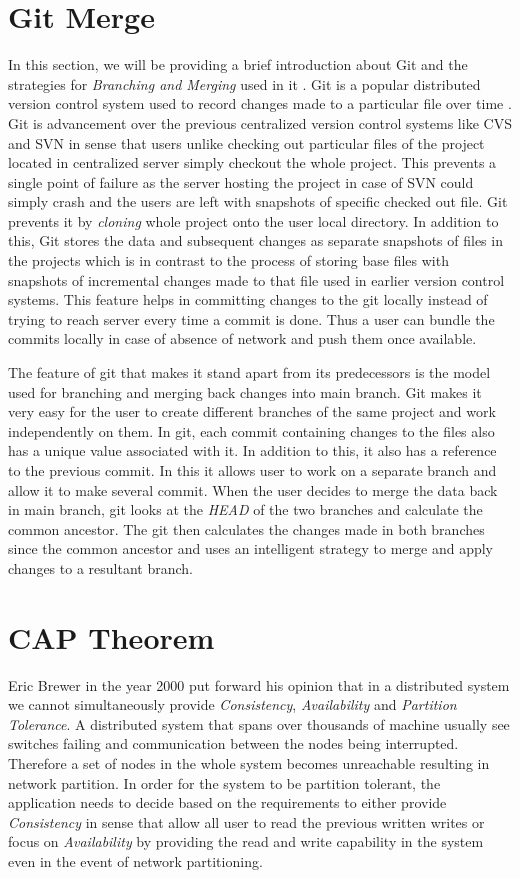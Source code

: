 \documentclass[12pt,a4paper,twoside,openright]{book}
\begin{document}
\section{Git Merge}
In this section, we will be providing a brief introduction about Git and the strategies for \textit{Branching and Merging} used in it \cite{gitmerge}. Git is a popular distributed version control system used to record changes made to a particular file over time \cite{gitVersionControl}. Git is advancement over the previous centralized version control systems like CVS \cite{cvs} and SVN \cite{svn} in sense that users unlike checking out particular files of the project located in centralized server simply checkout the whole project. This prevents a single point of failure as the server hosting the project in case of SVN could simply crash and the users are left with snapshots of specific checked out file. Git prevents it by \textit{cloning} whole project onto the user local directory. In addition to this, Git stores the data and subsequent changes as separate snapshots of files in the projects which is in contrast to the process of storing base files with snapshots of incremental changes made to that file used in earlier version control systems. This feature helps in committing changes to the git locally instead of trying to reach server every time a commit is done. Thus a user can bundle the commits locally in case of absence of network and push them once available.
\par The feature of git that makes it stand apart from its predecessors is the model used for branching and merging back changes into main branch. Git makes it very easy for the user to create different branches of the same project and work independently on them. In git, each commit containing changes to the files also has a unique value associated with it. In addition to this, it also has a reference to the previous commit. In this it allows user to work on a separate branch and allow it to make several commit. When the user decides to merge the data back in main branch, git looks at the \textit{HEAD} of the two branches and calculate the common ancestor. The git then calculates the changes made in both branches since the common ancestor and uses an intelligent strategy to merge and apply changes to a resultant branch. 


\section{CAP Theorem}
Eric Brewer in the year 2000 put forward his opinion that in a distributed system we cannot simultaneously provide \textit{Consistency}, \textit{Availability} and \textit{Partition Tolerance}. A distributed system that spans over thousands of machine usually see switches failing and communication between the nodes being interrupted. Therefore a set of nodes in the whole system becomes unreachable resulting in network partition. In order for the system to be partition tolerant, the application needs to decide based on the requirements to either provide \textit{Consistency} in sense that allow all user to read the previous written writes or focus on \textit{Availability} by providing the read and write capability in the system even in the event of network partitioning.
\end{document}
